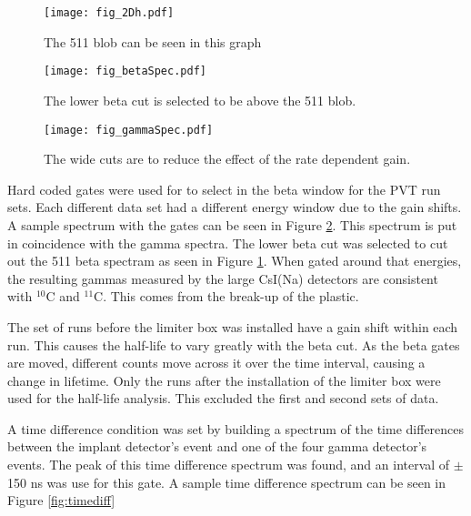 \begin{figure}[!htb]
	\centerline{\texttt{[image: fig\_2Dh.pdf]}}
	\caption{The 511 blob can be seen in this graph}
	\label{fig:2DGraph}
\end{figure}

\begin{figure}[!htb]
	\centerline{\texttt{[image: fig\_betaSpec.pdf]}}
	\caption{The lower beta cut is selected to be above the 511 blob.}
	\label{fig:BetaGraph}
\end{figure}

\begin{figure}[!htb]
	\centerline{\texttt{[image: fig\_gammaSpec.pdf]}}
	\caption{The wide cuts are to reduce the effect of the rate dependent gain.}
	\label{fig:Gammaraph}
\end{figure}

Hard coded gates were used for to select in the beta window for the PVT run sets.
Each different data set had a different energy window due to the gain shifts.
A sample spectrum with the gates can be seen in Figure \ref{fig:BetaGraph}.
This spectrum is put in coincidence with the gamma spectra. 
The lower beta cut was selected to cut out the 511 beta spectram as seen in Figure \ref{fig:2DGraph}.
When gated around that energies, the resulting gammas measured by the large CsI(Na) detectors are consistent with $^{10}$C and $^{11}$C.
This comes from the break-up of the plastic. 

The set of runs before the limiter box was installed have a gain shift within each run.
This causes the half-life to vary greatly with the beta cut.
As the beta gates are moved, different counts move across it over the time interval, causing a change in lifetime. 
Only the runs after the installation of the limiter box were used for the half-life analysis. 
This excluded the first and second sets of data.

%
A time difference condition was set by building a spectrum of the time differences between the implant detector's event and one of the four gamma detector's events. 
The peak of this time difference spectrum was found, and an interval of $\pm$150 ns  was use for this gate.
A sample time difference spectrum can be seen in Figure \ref{fig:timediff}

